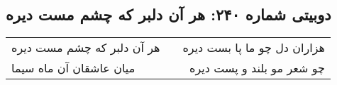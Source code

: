 \begin{center}
\section*{دوبیتی شماره ۲۴۰: هر آن دلبر که چشم مست دیره}
\label{sec:240}
\begin{longtable}{l p{0.5cm} r}
هر آن دلبر که چشم مست دیره
&&
هزاران دل چو ما پا بست دیره
\\
میان عاشقان آن ماه سیما
&&
چو شعر مو بلند و پست دیره
\\
\end{longtable}
\end{center}
